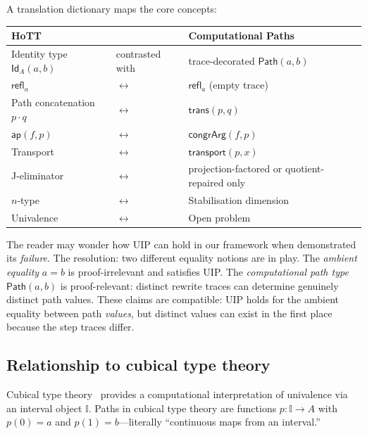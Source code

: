 \documentclass[manuscript]{BSLstyle}
\newcommand{\Path}{\mathsf{Path}}
\newcommand{\refl}{\mathsf{refl}}
\newcommand{\trans}{\mathsf{trans}}
\newcommand{\congrArg}{\mathsf{congrArg}}
\newcommand{\transport}{\mathsf{transport}}
\newcommand{\Id}{\mathsf{Id}}
\begin{document}
A translation dictionary maps the core concepts:

\begin{center}
\small
\begin{tabular}{lll}
\toprule
\textbf{HoTT} & & \textbf{Computational Paths} \\
\midrule
Identity type $\Id_A(a,b)$ & contrasted with & trace-decorated $\Path(a, b)$ \\
$\mathsf{refl}_a$ & $\longleftrightarrow$ & $\refl_a$ (empty trace) \\
Path concatenation $p \mathbin{\cdot} q$ & $\longleftrightarrow$ & $\trans(p, q)$ \\
$\mathsf{ap}(f, p)$ & $\longleftrightarrow$ & $\congrArg(f, p)$ \\
Transport & $\longleftrightarrow$ & $\transport(p, x)$ \\
J-eliminator & $\longleftrightarrow$ & projection-factored or quotient-repaired only \\
$n$-type & $\longleftrightarrow$ & Stabilisation dimension \\
Univalence & $\longleftrightarrow$ & Open problem \\
\bottomrule
\end{tabular}
\end{center}

\begin{remark}
The reader may wonder how UIP can hold in our framework when
 demonstrated its \emph{failure}.  The resolution:
two different equality notions are in play.  The \emph{ambient equality}
$a = b$ is proof-irrelevant and satisfies UIP.  The \emph{computational
path type} $\Path(a,b)$ is proof-relevant: distinct rewrite traces can
determine genuinely distinct path values.  These claims are compatible:
UIP holds for the ambient equality between path \emph{values}, but
distinct values can exist in the first place because the step traces
differ.
\end{remark}

\subsection{Relationship to cubical type theory}

Cubical type theory~\cite{CCHM18,ABCFHL21} provides a computational
interpretation of univalence via an interval object $\mathbb{I}$.  Paths
in cubical type theory are functions $p : \mathbb{I} \to A$ with
$p(0) = a$ and $p(1) = b$---literally ``continuous maps from an interval.''
\end{document}
